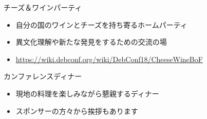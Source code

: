 \documentclass[mingoth,a4paper]{jsarticle}
\begin{document}


チーズ＆ワインパーティ
\begin{itemize}
  \item 自分の国のワインとチーズを持ち寄るホームパーティ
  \item 異文化理解や新たな発見をするための交流の場
  \item \url{https://wiki.debconf.org/wiki/DebConf18/CheeseWineBoF}
\end{itemize}


カンファレンスディナー
\begin{itemize}
  \item 現地の料理を楽しみながら懇親するディナー
  \item スポンサーの方々から挨拶もあります
\end{itemize}

\end{document}
